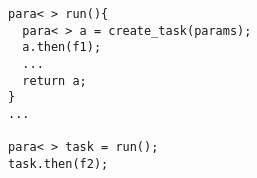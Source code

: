 
\begin{lstlisting}[mathescape]
para< > run(){
  para< > a = create_task(params);
  a.then(f1);
  ...
  return a;
}
...

para< > task = run();
task.then(f2);
\end{lstlisting}
